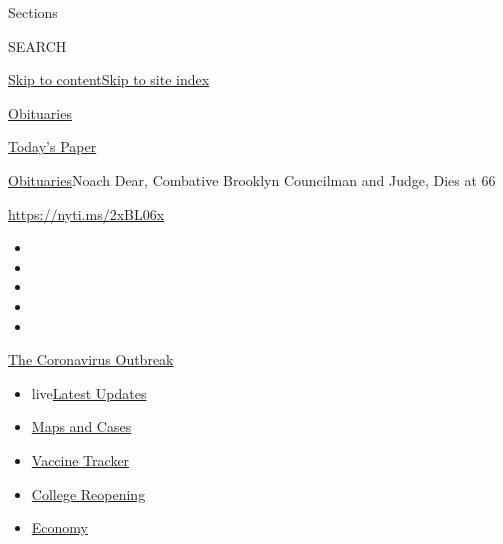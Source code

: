 Sections

SEARCH

\protect\hyperlink{site-content}{Skip to
content}\protect\hyperlink{site-index}{Skip to site index}

\href{https://www.nytimes.com/section/obituaries}{Obituaries}

\href{https://myaccount.nytimes.com/auth/login?response_type=cookie\&client_id=vi}{}

\href{https://www.nytimes.com/section/todayspaper}{Today's Paper}

\href{/section/obituaries}{Obituaries}\textbar{}Noach Dear, Combative
Brooklyn Councilman and Judge, Dies at 66

\url{https://nyti.ms/2xBL06x}

\begin{itemize}
\item
\item
\item
\item
\item
\end{itemize}

\href{https://www.nytimes.com/news-event/coronavirus?action=click\&pgtype=Article\&state=default\&region=TOP_BANNER\&context=storylines_menu}{The
Coronavirus Outbreak}

\begin{itemize}
\tightlist
\item
  live\href{https://www.nytimes.com/2020/08/03/world/coronavirus-covid-19.html?action=click\&pgtype=Article\&state=default\&region=TOP_BANNER\&context=storylines_menu}{Latest
  Updates}
\item
  \href{https://www.nytimes.com/interactive/2020/us/coronavirus-us-cases.html?action=click\&pgtype=Article\&state=default\&region=TOP_BANNER\&context=storylines_menu}{Maps
  and Cases}
\item
  \href{https://www.nytimes.com/interactive/2020/science/coronavirus-vaccine-tracker.html?action=click\&pgtype=Article\&state=default\&region=TOP_BANNER\&context=storylines_menu}{Vaccine
  Tracker}
\item
  \href{https://www.nytimes.com/2020/08/02/us/covid-college-reopening.html?action=click\&pgtype=Article\&state=default\&region=TOP_BANNER\&context=storylines_menu}{College
  Reopening}
\item
  \href{https://www.nytimes.com/live/2020/08/03/business/stock-market-today-coronavirus?action=click\&pgtype=Article\&state=default\&region=TOP_BANNER\&context=storylines_menu}{Economy}
\end{itemize}

